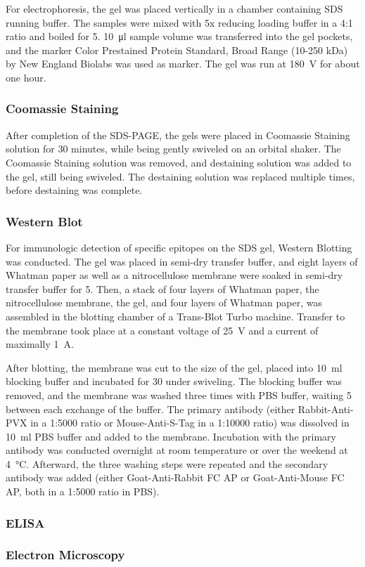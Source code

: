 For electrophoresis, the gel was placed vertically in a chamber containing SDS running buffer. The samples were mixed with 5x reducing loading buffer in a 4:1 ratio and boiled for \SI{5}{\min}. \SI{10}{\micro\litre} sample volume was transferred into the gel pockets, and the marker Color Prestained Protein Standard, Broad Range (10-250 kDa) by New England Biolabs was used as marker. The gel was run at \SI{180}{\volt} for about one hour. 

\subsubsection{Coomassie Staining}
After completion of the SDS-PAGE, the gels were placed in Coomassie Staining solution for 30 minutes, while being gently swiveled on an orbital shaker. The Coomassie Staining solution was removed, and destaining solution was added to the gel, still being swiveled. The destaining solution was replaced multiple times, before destaining was complete. 

\subsubsection{Western Blot}
For immunologic detection of specific epitopes on the SDS gel, Western Blotting was conducted. The gel was placed in semi-dry transfer buffer, and eight layers of Whatman paper as well as a nitrocellulose membrane were soaked in semi-dry transfer buffer for \SI{5}{\min}. Then, a stack of four layers of Whatman paper, the nitrocellulose membrane, the gel, and four layers of Whatman paper, was assembled in the blotting chamber of a Trans-Blot\textsuperscript{\textregistered} Turbo\textsuperscript{\texttrademark} machine. Transfer to the membrane took place at a constant voltage of \SI{25}{\volt} and a current of maximally \SI{1}{\ampere}.

After blotting, the membrane was cut to the size of the gel, placed into \SI{10}{\milli\litre} blocking buffer and incubated for \SI{30}{\min} under swiveling. The blocking buffer was removed, and the membrane was washed three times with PBS buffer, waiting \SI{5}{\min} between each exchange of the buffer. The primary antibody (either Rabbit-Anti-PVX in a 1:5000 ratio or Mouse-Anti-S-Tag in a 1:10000 ratio) was dissolved in \SI{10}{\milli\litre} PBS buffer and added to the membrane. Incubation with the primary antibody was conducted overnight at room temperature or over the weekend at \SI{4}{\degreeCelsius}. Afterward, the three washing steps were repeated and the secondary antibody was added (either Goat-Anti-Rabbit FC AP or Goat-Anti-Mouse FC AP, both in a 1:5000 ratio in PBS). 
\subsubsection{ELISA}
\subsubsection{Electron Microscopy}